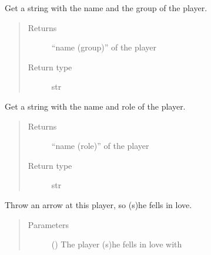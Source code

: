 \documentclass[letterpaper,10pt,english]{sphinxmanual}
\begin{document}
\begin{fulllineitems}

\begin{fulllineitems}
\label{\detokenize{chatwolf:chatwolf.player.Player.get_name_group}}
Get a string with the name and the group of the player.
\begin{quote}\begin{description}
\item[{Returns}] \leavevmode
“name (group)” of the player

\item[{Return type}] \leavevmode
str

\end{description}\end{quote}

\end{fulllineitems}


\begin{fulllineitems}
\label{\detokenize{chatwolf:chatwolf.player.Player.get_name_role}}
Get a string with the name and role of the player.
\begin{quote}\begin{description}
\item[{Returns}] \leavevmode
“name (role)” of the player

\item[{Return type}] \leavevmode
str

\end{description}\end{quote}

\end{fulllineitems}


\begin{fulllineitems}
\label{\detokenize{chatwolf:chatwolf.player.Player.love_arrow}}
Throw an arrow at this player, so (s)he fells in love.
\begin{quote}\begin{description}
\item[{Parameters}] \leavevmode
{} ({\hyperref[\detokenize{chatwolf:chatwolf.player.Player}]{}}) \textendash{} The player (s)he fells in love with

\end{description}\end{quote}

\end{fulllineitems}


\end{fulllineitems}
\end{document}
